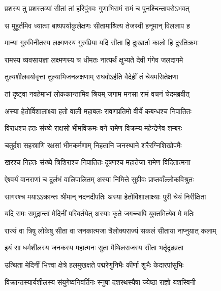 
\twolineshloka
{प्रशस्य तु प्रशस्तव्यां सीतां तां हरिपुंगवः}
{गुणाभिरामं रामं च पुनश्चिन्तापरोऽभवत्} %

\twolineshloka
{स मुहूर्तमिव ध्यात्वा बाष्पपर्याकुलेक्षणः}
{सीतामाश्रित्य तेजस्वी हनूमान् विललाप ह} %

\twolineshloka
{मान्या गुरुविनीतस्य लक्ष्मणस्य गुरुप्रिया}
{यदि सीता हि दुःखार्ता कालो हि दुरतिक्रमः} %

\twolineshloka
{रामस्य व्यवसायज्ञा लक्ष्मणस्य च धीमतः}
{नात्यर्थं क्षुभ्यते देवी गंगेव जलदागमे} %

\twolineshloka
{तुल्यशीलवयोवृत्तां तुल्याभिजनलक्षणाम्}
{राघवोऽर्हति वैदेहीं तं चेयमसितेक्षणा} %

\twolineshloka
{तां दृष्ट्वा नवहेमाभां लोककान्तामिव श्रियम्}
{जगाम मनसा रामं वचनं चेदमब्रवीत्} %

\twolineshloka
{अस्या हेतोर्विशालाक्ष्या हतो वाली महाबलः}
{रावणप्रतिमो वीर्ये कबन्धश्च निपातितः} %

\twolineshloka
{विराधश्च हतः संख्ये राक्षसो भीमविक्रमः}
{वने रामेण विक्रम्य महेन्द्रेणेव शम्बरः} %

\twolineshloka
{चतुर्दश सहस्राणि रक्षसां भीमकर्मणाम्}
{निहतानि जनस्थाने शरैरग्निशिखोपमैः} %

\twolineshloka
{खरश्च निहतः संख्ये त्रिशिराश्च निपातितः}
{दूषणश्च महातेजा रामेण विदितात्मना} %

\twolineshloka
{ऐश्वर्यं वानराणां च दुर्लभं वालिपालितम्}
{अस्या निमित्ते सुग्रीवः प्राप्तवाँल्लोकविश्रुतः} %

\twolineshloka
{सागरश्च मयाऽऽक्रान्तः श्रीमान् नदनदीपतिः}
{अस्या हेतोर्विशालाक्ष्याः पुरी चेयं निरीक्षिता} %

\twolineshloka
{यदि रामः समुद्रान्तां मेदिनीं परिवर्तयेत्}
{अस्याः कृते जगच्चापि युक्तमित्येव मे मतिः} %

\twolineshloka
{राज्यं वा त्रिषु लोकेषु सीता वा जनकात्मजा}
{त्रैलोक्यराज्यं सकलं सीताया नाप्नुयात् कलाम्} %

\twolineshloka
{इयं सा धर्मशीलस्य जनकस्य महात्मनः}
{सुता मैथिलराजस्य सीता भर्तृदृढव्रता} %

\twolineshloka
{उत्थिता मेदिनीं भित्त्वा क्षेत्रे हलमुखक्षते}
{पद्मरेणुनिभैः कीर्णा शुभैः केदारपांसुभिः} %

\twolineshloka
{विक्रान्तस्यार्यशीलस्य संयुगेष्वनिवर्तिनः}
{स्नुषा दशरथस्यैषा ज्येष्ठा राज्ञो यशस्विनी} %

